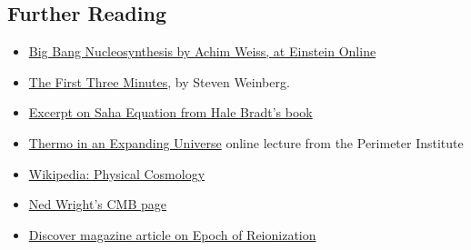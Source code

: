 \clearpage
\subsection{Further Reading}
\begin{itemize}
\item \href{http://www.einstein-online.info/spotlights/BBN/?set_language=en}{Big Bang Nucleosynthesis by Achim Weiss, at Einstein Online}
\item \href{http://www.goodreads.com/book/show/150131.The_First_Three_Minutes}{The First Three Minutes}, by Steven Weinberg.
\item \href{http://www.cambridge.org/resources/0521846560/7706_Saha%20equation.pdf}{Excerpt on Saha Equation from Hale Bradt's book}
\item \href{http://udp.classroom.tv/class/14841/lecture-8-thermodynamics-in-an-expanding-universe-freeze-out-big-bang-nucleosynthesis}{Thermo in an Expanding Universe} online lecture from the Perimeter Institute
\item \href{http://en.wikipedia.org/wiki/Physical_cosmology}{Wikipedia: Physical Cosmology}
\item \href{http://www.astro.ucla.edu/~wright/CMB.html}{Ned Wright's CMB page}
\item \href{http://discovermagazine.com/2014/april/12-first-light}{Discover magazine article on Epoch of Reionization}
\end{itemize}

